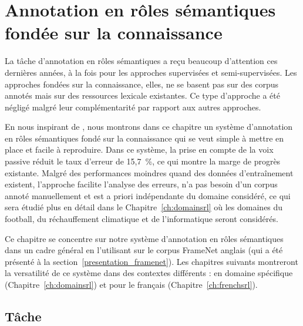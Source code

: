 \chapter{Annotation en rôles sémantiques fondée sur la connaissance}
\label{ch:srl}




La tâche d'annotation en rôles sémantiques a reçu beaucoup d'attention ces
dernières années, à la fois pour les approches supervisées et semi-supervisées.
Les approches fondées sur la connaissance, elles, ne se basent pas sur des
corpus annotés mais sur des ressources lexicale existantes. Ce type d'approche
a été négligé malgré leur complémentarité par rapport aux autres approches.

En nous inspirant de \citep{swier2004unsupervised,swier2005exploiting}, nous
montrons dans ce chapitre un système d'annotation en rôles sémantiques fondé
sur la connaissance qui se veut simple à mettre en place et facile à
reproduire. Dans ce système, la prise en compte de la voix passive réduit le
taux d'erreur de 15,7~\%, ce qui montre la marge de progrès existante. Malgré
des performances moindres quand des données d'entraînement existent, l'approche
facilite l'analyse des erreurs, n'a pas besoin d'un corpus annoté manuellement
et est a priori indépendante du domaine considéré, ce qui sera étudié plus en
détail dans le Chapitre~\ref{ch:domainsrl} où les domaines du football, du
réchauffement climatique et de l'informatique seront considérés.

Ce chapitre se concentre sur notre système d'annotation en rôles sémantiques
dans un cadre général en l'utilisant sur le corpus FrameNet anglais (qui a été
présenté à la section~\ref{presentation_framenet}). Les chapitres suivants
montreront la versatilité de ce système dans des contextes différents : en
domaine spécifique (Chapitre~\ref{ch:domainsrl}) et pour le français
(Chapitre~\ref{ch:frenchsrl}).

\section{Tâche}

